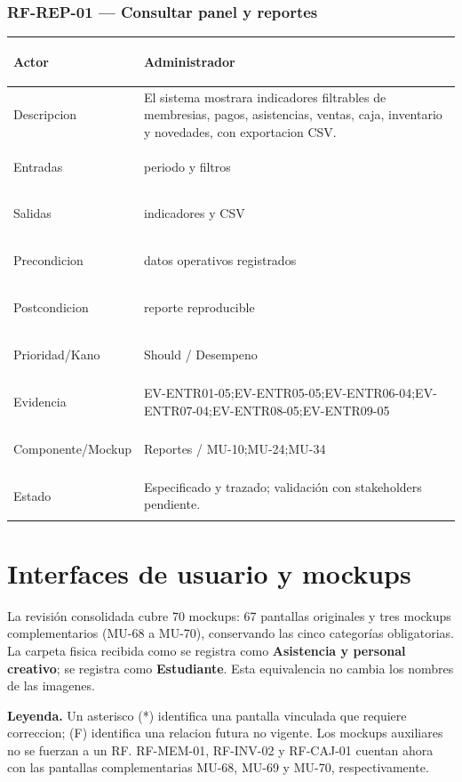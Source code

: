 \documentclass[11pt,a4paper,twoside]{article}
\begin{document}
\subsubsection{RF-REP-01 — Consultar panel y reportes}
\begingroup
\renewcommand{\arraystretch}{1.12}
\setlength{\tabcolsep}{5pt}
\begin{tabularx}{\textwidth}{|>{\bfseries\raggedright\arraybackslash}p{3.35cm}|>{\raggedright\arraybackslash}X|}
\hline
Actor & Administrador \\ \hline
Descripcion & El sistema mostrara indicadores filtrables de membresias, pagos, asistencias, ventas, caja, inventario y novedades, con exportacion CSV. \\ \hline
Entradas & periodo y filtros \\ \hline
Salidas & indicadores y CSV \\ \hline
Precondicion & datos operativos registrados \\ \hline
Postcondicion & reporte reproducible \\ \hline
Prioridad/Kano & Should / Desempeno \\ \hline
Evidencia & EV-ENTR01-05;EV-ENTR05-05;EV-ENTR06-04;EV-ENTR07-04;EV-ENTR08-05;EV-ENTR09-05 \\ \hline
Componente/Mockup & Reportes / MU-10;MU-24;MU-34 \\ \hline
Estado & Especificado y trazado; validación con stakeholders pendiente. \\ \hline
\end{tabularx}
\endgroup


\section{Interfaces de usuario y mockups}
La revisión consolidada cubre 70 mockups: 67 pantallas originales y tres mockups complementarios (MU-68 a MU-70), conservando las cinco categorías obligatorias. La carpeta fisica recibida como  se registra como \textbf{Asistencia y personal creativo};  se registra como \textbf{Estudiante}. Esta equivalencia no cambia los nombres de las imagenes.

\textbf{Leyenda.} Un asterisco (*) identifica una pantalla vinculada que requiere correccion; (F) identifica una relacion futura no vigente. Los mockups auxiliares no se fuerzan a un RF. RF-MEM-01, RF-INV-02 y RF-CAJ-01 cuentan ahora con las pantallas complementarias MU-68, MU-69 y MU-70, respectivamente.
\end{document}
